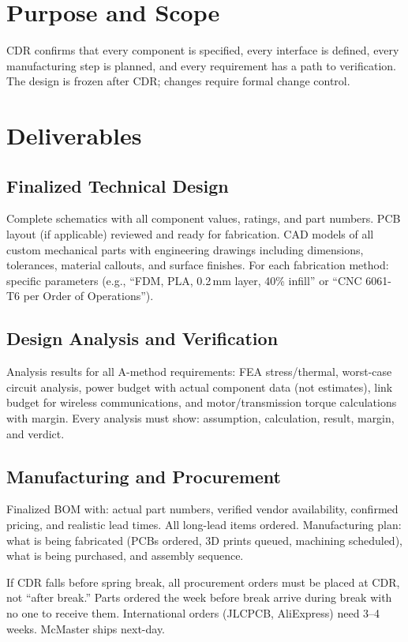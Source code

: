 \documentclass[11pt,letterpaper,twoside,openany]{book}
\begin{document}
\section{Purpose and Scope}
CDR confirms that every component is specified, every interface is defined, every manufacturing step is planned, and every requirement has a path to verification. The design is frozen after CDR; changes require formal change control.

\section{Deliverables}

\subsection{Finalized Technical Design}
Complete schematics with all component values, ratings, and part numbers. PCB layout (if applicable) reviewed and ready for fabrication. CAD models of all custom mechanical parts with engineering drawings including dimensions, tolerances, material callouts, and surface finishes. For each fabrication method: specific parameters (e.g., ``FDM, PLA, 0.2\,mm layer, 40\% infill'' or ``CNC 6061-T6 per Order of Operations'').

\subsection{Design Analysis and Verification}
Analysis results for all A-method requirements: FEA stress/thermal, worst-case circuit analysis, power budget with actual component data (not estimates), link budget for wireless communications, and motor/transmission torque calculations with margin. Every analysis must show: assumption, calculation, result, margin, and verdict.

\subsection{Manufacturing and Procurement}
Finalized BOM with: actual part numbers, verified vendor availability, confirmed pricing, and realistic lead times. All long-lead items ordered. Manufacturing plan: what is being fabricated (PCBs ordered, 3D prints queued, machining scheduled), what is being purchased, and assembly sequence.

\begin{tipbox}
If CDR falls before spring break, all procurement orders must be placed at CDR, not ``after break.'' Parts ordered the week before break arrive during break with no one to receive them. International orders (JLCPCB, AliExpress) need 3--4 weeks. McMaster ships next-day.
\end{tipbox}
\end{document}
